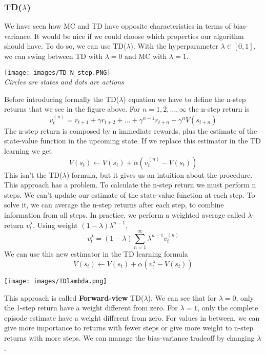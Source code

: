 \documentclass[../main.tex]{subfiles}
\begin{document}
\subsubsection{\texorpdfstring{TD($\lambda$)}{TD(lambda)}}
We have seen how MC and TD have opposite characteristics in terms of bias-variance. It would be nice if we could choose which properties our algorithm should have. To do so, we can use TD($\lambda$). With the hyperparameter $\lambda \in [0,1]$, we can swing between TD with $\lambda=0$ and MC with $\lambda=1$.
\begin{center}
    \texttt{[image: images/TD-N\_step.PNG]} \\
    \textit{Circles are states and dots are actions}
\end{center}
Before introducing formally the TD($\lambda$) equation  we have to define the n-step returns that we see in the figure above.
For $n=1,2,\dots,\infty$ the n-step return is
\begin{equation}
    v_t^{(n)} = r_{t+1} + \gamma r_{t+2} + \dots + \gamma^{n-1}r_{t+n} + \gamma^n V(s_{t+n})
\end{equation}
The n-step return is composed by n immediate rewards, plus the estimate of the state-value function in the upcoming state.
If we replace this estimator in the TD learning we get
\begin{equation*}
    V(s_t) \leftarrow V(s_t) + \alpha(v_t^{(n)}-V(s_t))
\end{equation*}
This isn't the TD($\lambda$) formula, but it gives us an intuition about the procedure. This approach has a problem. To calculate the n-step return we must perform n steps. We can't update our estimate of the state-value function at each step. To solve it, we can average the n-step returns after each step, to combine information from all steps.
In practice, we perform a weighted average called $\lambda$-return $v_t^{\lambda}$. Using weight $(1-\lambda)\lambda^{n-1}$,
\begin{equation}
    v_t^{\lambda} = (1-\lambda) \sum_{n=1}^{\infty} \lambda^{n-1} v_t^{(n)}
\end{equation}
We can use this new estimator in the TD learning formula
\begin{equation}
    V(s_t) \leftarrow V(s_t) + \alpha(v_t^{\lambda}-V(s_t))
\end{equation}

\begin{center}
    \texttt{[image: images/TDlambda.png]}
\end{center}
This approach is called \textbf{Forward-view} TD($\lambda$). We can see that for $\lambda=0$, only the 1-step return have a weight different from zero. For $\lambda=1$, only the complete episode estimate have a weight different from zero. For values in between, we can give more importance to returns with fewer steps or give more weight to n-step returns with more steps. We can manage the bias-variance tradeoff by changing $\lambda$.
\end{document}
